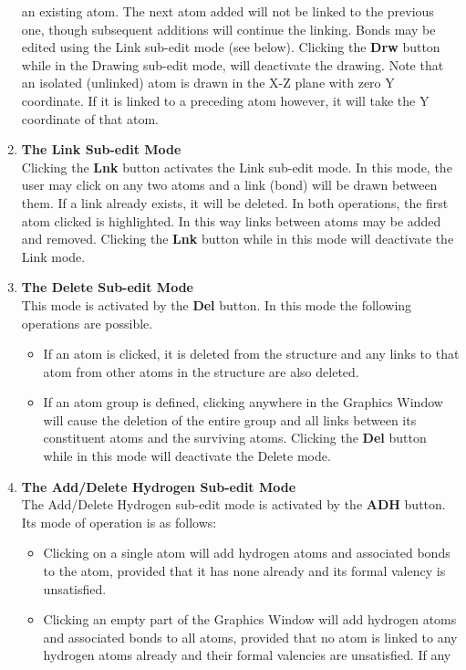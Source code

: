 \begin{enumerate}
  an existing atom. The next atom added will not be linked to the previous
  one, though subsequent additions will continue the linking. Bonds may be
  edited using the Link sub-edit mode (see below). Clicking the {\bf Drw}
  button while in the Drawing sub-edit mode, will deactivate the drawing. Note
  that an isolated (unlinked) atom is drawn in the X-Z plane with zero Y
  coordinate. If it is linked to a preceding atom however, it will take the Y
  coordinate of that atom.
\item {\bf The Link Sub-edit Mode}\\
  Clicking the {\bf Lnk} button activates the Link sub-edit mode. In this
  mode, the user may click on any two atoms and a link (bond) will be drawn
  between them. If a link already exists, it will be deleted. In both
  operations, the first atom clicked is highlighted. In this way links between
  atoms may be added and removed. Clicking the {\bf Lnk} button while in this
  mode will deactivate the Link mode.
\item {\bf The Delete Sub-edit Mode}\\
  This mode is activated by the {\bf Del} button. In this mode the following
  operations are possible.
\begin{itemize}
\item If an atom is clicked, it is deleted from the structure and any links to
  that atom from other atoms in the structure are also deleted.  
\item If an atom group is defined, clicking anywhere in the Graphics Window
  will cause the deletion of the entire group and all links between its
  constituent atoms and the surviving atoms. Clicking the {\bf Del} button
  while in this mode will deactivate the Delete mode.
\end{itemize}
\item {\bf The Add/Delete Hydrogen Sub-edit Mode}\\
  The Add/Delete Hydrogen sub-edit mode is activated by the {\bf ADH} button.
  Its mode of operation is as follows:
\begin{itemize}
\item Clicking on a single atom will add hydrogen atoms and associated bonds
  to the atom, provided that it has none already and its formal valency is
  unsatisfied.  
\item Clicking an empty part of the Graphics Window will add hydrogen atoms
  and associated bonds to all atoms, provided that no atom is linked to any
  hydrogen atoms already and their formal valencies are unsatisfied. If any

\end{itemize}
\end{enumerate}
